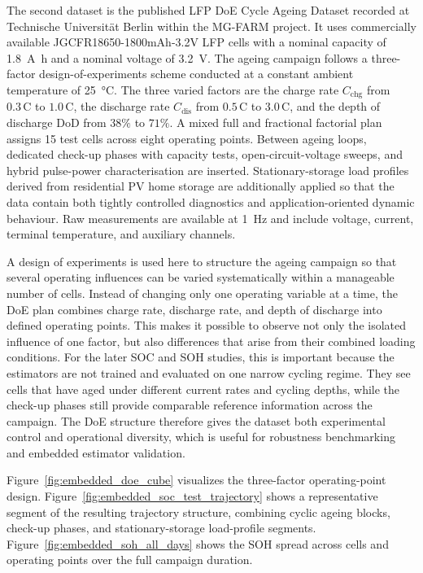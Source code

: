 \documentclass[
    a4paper,
    12pt,
    titlepage,
    bibliography=totoc,
    twoside=on,
    parskip=false,
    numbers=noenddot,
    cleardoublepage=empty,
    DIV=12,
    BCOR=12.0mm,
    headheight=36pt,
    headings=openright
]{scrreprt}
\begin{document}
The second dataset is the published LFP DoE Cycle Ageing Dataset recorded at Technische Universit\"at Berlin within the MG-FARM project.\autocite{lfpDoeCycleAgingDataset2025} It uses commercially available JGCFR18650-1800mAh-3.2V LFP cells with a nominal capacity of \SI{1.8}{\ampere\hour} and a nominal voltage of \SI{3.2}{\volt}. The ageing campaign follows a three-factor design-of-experiments scheme conducted at a constant ambient temperature of \SI{25}{\celsius}. The three varied factors are the charge rate $C_\mathrm{chg}$ from $0.3\,\mathrm{C}$ to $1.0\,\mathrm{C}$, the discharge rate $C_\mathrm{dis}$ from $0.5\,\mathrm{C}$ to $3.0\,\mathrm{C}$, and the depth of discharge $\mathrm{DoD}$ from $38\%$ to $71\%$. A mixed full and fractional factorial plan assigns 15 test cells across eight operating points. Between ageing loops, dedicated check-up phases with capacity tests, open-circuit-voltage sweeps, and hybrid pulse-power characterisation are inserted. Stationary-storage load profiles derived from residential PV home storage are additionally applied so that the data contain both tightly controlled diagnostics and application-oriented dynamic behaviour. Raw measurements are available at \SI{1}{\hertz} and include voltage, current, terminal temperature, and auxiliary channels.

A design of experiments is used here to structure the ageing campaign so that several operating influences can be varied systematically within a manageable number of cells.\autocite{siebertzStatistischeVersuchsplanung2017} Instead of changing only one operating variable at a time, the DoE plan combines charge rate, discharge rate, and depth of discharge into defined operating points. This makes it possible to observe not only the isolated influence of one factor, but also differences that arise from their combined loading conditions. For the later SOC and SOH studies, this is important because the estimators are not trained and evaluated on one narrow cycling regime. They see cells that have aged under different current rates and cycling depths, while the check-up phases still provide comparable reference information across the campaign. The DoE structure therefore gives the dataset both experimental control and operational diversity, which is useful for robustness benchmarking and embedded estimator validation.

Figure~\ref{fig:embedded_doe_cube} visualizes the three-factor operating-point design. Figure~\ref{fig:embedded_soc_test_trajectory} shows a representative segment of the resulting trajectory structure, combining cyclic ageing blocks, check-up phases, and stationary-storage load-profile segments. Figure~\ref{fig:embedded_soh_all_days} shows the SOH spread across cells and operating points over the full campaign duration.
\end{document}
